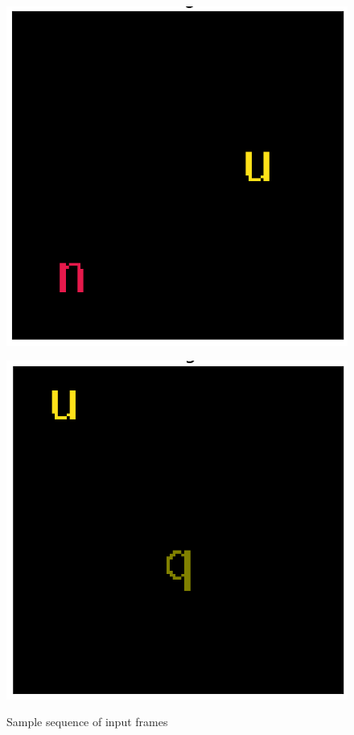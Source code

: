 \begin{figure}[!h]
\begin{minipage}{0.25\textwidth}
	\label{fig:frame-1}
\end{minipage}\hfill
\begin{minipage}{0.25\textwidth}
	\centering
	\includegraphics[width=0.9\linewidth]{"../img/visualization/sample 2/Frame 3"}
	\label{fig:frame-1}
\end{minipage}\hfill
\begin{minipage}{0.25\textwidth}
	\centering
	\includegraphics[width=0.9\linewidth]{"../img/visualization/sample 2/Frame 4"}
		\label{fig:frame-1}
\end{minipage}
\caption{Sample sequence of input frames} 
\label{fig:frame-seq}
\end{figure}

